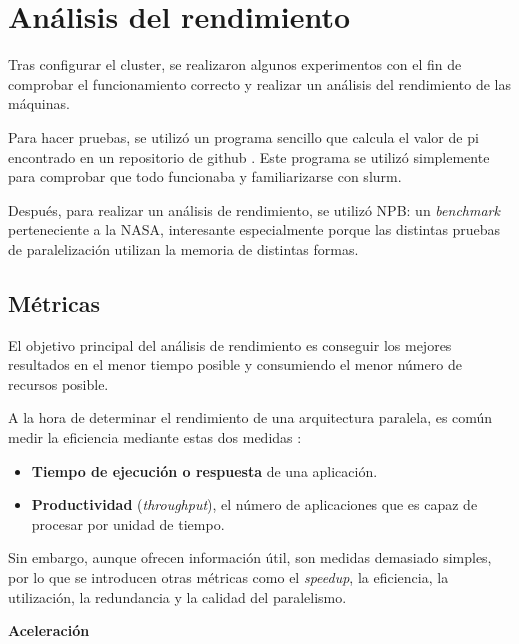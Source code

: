 \section{Análisis del rendimiento}

Tras configurar el cluster,  se realizaron algunos experimentos con el fin de comprobar el funcionamiento correcto y realizar un análisis del rendimiento de las máquinas.

Para hacer pruebas, se utilizó un programa sencillo que calcula el valor de pi encontrado en un repositorio de github \cite{openmpirepo}. Este programa se utilizó simplemente para comprobar que todo funcionaba y familiarizarse con slurm. 

Después, para realizar un análisis de rendimiento, se utilizó NPB: un \emph{benchmark} perteneciente a la NASA, interesante especialmente porque las distintas pruebas de paralelización utilizan la memoria de distintas formas.

\subsection{Métricas}

El objetivo principal del análisis de rendimiento es conseguir los mejores resultados en el menor tiempo posible y consumiendo el menor número de recursos posible.
\vspace{2mm}

A la hora de determinar el rendimiento de una arquitectura paralela, es común medir la eficiencia mediante estas dos medidas \cite{parelismoyrendimiento}:
\vspace{2mm}

\begin{itemize}
\item \textbf{Tiempo de ejecución o respuesta} de una aplicación.

\item \textbf{Productividad} (\emph{throughput}), el número de aplicaciones que es capaz de procesar por unidad de tiempo.
\end{itemize}

\vspace{2mm}
Sin embargo, aunque ofrecen información útil, son medidas demasiado simples, por lo que se introducen otras métricas como el \emph{speedup}, la eficiencia, la utilización, la redundancia y la calidad del paralelismo.

\vspace{6mm}
\textbf{Aceleración}
\vspace{2mm}

